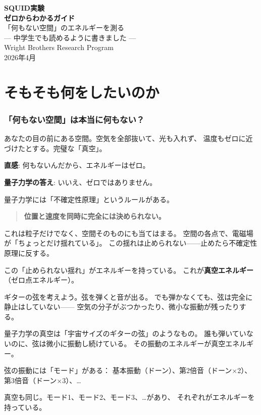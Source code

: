 \documentclass[12pt,a4paper]{article}
\begin{document}
\begin{center}
{\Huge\bfseries SQUID実験}\\[0.3cm]
{\Huge\bfseries ゼロからわかるガイド}\\[0.8cm]
{\Large 「何もない空間」のエネルギーを測る}\\[0.5cm]
{\Large --- 中学生でも読めるように書きました ---}\\[1.5cm]
{\large Wright Brothers Research Program}\\[0.3cm]
{2026年4月}
\end{center}

\vspace{0.5cm}
\tableofcontents
\newpage

\part{そもそも何をしたいのか}

\section{「何もない空間」は本当に何もない？}

あなたの目の前にある空間。空気を全部抜いて、光も入れず、
温度もゼロに近づけたとする。完璧な「真空」。

\textbf{直感}: 何もないんだから、エネルギーはゼロ。

\textbf{量子力学の答え}: いいえ、ゼロではありません。

\begin{naruhodox}
量子力学には「不確定性原理」というルールがある。

\begin{quote}
\textbf{位置と速度を同時に完全には決められない。}
\end{quote}

これは粒子だけでなく、空間そのものにも当てはまる。
空間の各点で、電磁場が「ちょっとだけ揺れている」。
この揺れは止められない——止めたら不確定性原理に反する。

この「止められない揺れ」がエネルギーを持っている。
これが\textbf{真空エネルギー}（ゼロ点エネルギー）。
\end{naruhodox}

\begin{tatoebabox}
ギターの弦を考えよう。弦を弾くと音が出る。
でも弾かなくても、弦は完全に静止はしていない——
空気の分子がぶつかったり、微小な振動が残ったりする。

量子力学の真空は「宇宙サイズのギターの弦」のようなもの。
誰も弾いていないのに、弦は微小に振動し続けている。
その振動のエネルギーが真空エネルギー。

弦の振動には「モード」がある：
基本振動（ドーン）、第2倍音（ドーン×2）、第3倍音（ドーン×3）、\ldots

真空も同じ。モード1、モード2、モード3、\ldots があり、
それぞれがエネルギーを持っている。
\end{tatoebabox}
\end{document}
